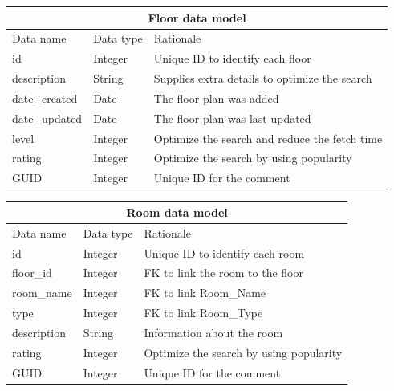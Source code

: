 \documentclass{sig-alt-release2}
\begin{document}



\small{
\begin{tabular}{| p{1.8cm} | p{1cm} | p{4.2cm}|}
\hline
\multicolumn{3}{|c|}{\textbf{Floor data model}} \\
\hline
Data name & Data type & Rationale \\
\hline
id & Integer & Unique ID to identify each floor \\
\hline
description & String & Supplies extra details to optimize the search\\
\hline
date\_created & Date & The floor plan was added\\
\hline
date\_updated & Date & The floor plan was last updated\\
\hline
level & Integer & Optimize the search and reduce the fetch time\\
\hline
rating & Integer & Optimize the search by using popularity\\
\hline
GUID & Integer & Unique ID for the comment\\
\hline
\end{tabular}}	

\vspace{1em}

\begin{tabular}{| p{1.8cm} | p{1cm} | p{4.2cm}|}
\hline
\multicolumn{3}{|c|}{\textbf{Room data model}} \\
\hline
Data name & Data type & Rationale \\
\hline
id & Integer & Unique ID to identify each room \\
\hline
floor\_id & Integer & FK to link the room to the floor\\
\hline
room\_name & Integer & FK to link Room\_Name\\
\hline
type & Integer & FK to link Room\_Type \\
\hline
description & String & Information about the room\\
\hline
rating & Integer & Optimize the search by using popularity\\
\hline
GUID & Integer & Unique ID for the comment\\
\hline
\end{tabular}	
\end{document}
